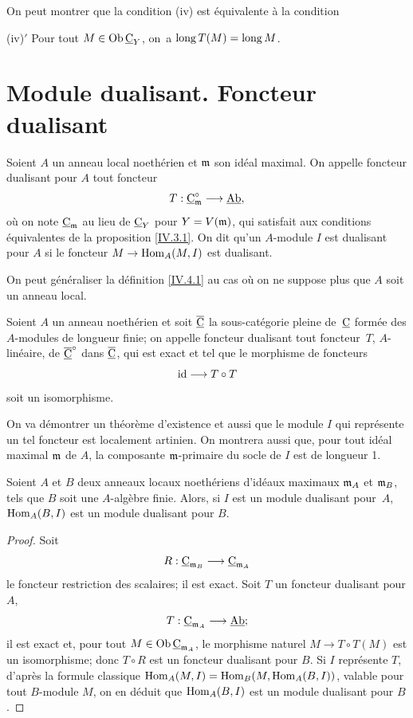 \begin{remarque} \label{IV.3.2}
On peut montrer que la condition (iv) est \'equivalente \`a la condition

(iv)$'$ Pour tout $M\in \operatorname{Ob} \underline{\mathrm{C}}_{Y}$, on~a $\operatorname{long} T(M)=\operatorname{long} M$.
\end{remarque}

\section{Module dualisant. Foncteur dualisant} \label{IV.4}

\begin{definition} \label{IV.4.1}
Soient $A$ un anneau local noeth\'erien et $\mathfrak{m}$ son id\'eal maximal. On appelle foncteur dualisant pour $A$ tout foncteur
$$
T:\ccat^{\circ}_\mm\to \Ab,
$$
o\`u on note $\underline{\mathrm{C}}_{\mathfrak{m}}$ au lieu de $\underline{\mathrm{C}}_{Y}$ pour $Y=V(\mathfrak{m})$, qui satisfait aux conditions \'equivalentes de la proposition \ref{IV.3.1}. On dit qu'un $A$-module $I$ est dualisant pour $A$ si le foncteur $M\to \Hom_{A}(M, I)$ est dualisant.
\end{definition}

On peut g\'en\'eraliser la d\'efinition \ref{IV.4.1} au cas o\`u on ne suppose plus que $A$ soit un anneau local.

\begin{definition} \label{IV.4.2}
Soient $A$ un anneau noeth\'erien et soit $\overline{\underline{\mathrm{C}}}$ la sous-cat\'egorie pleine de~$\underline{\mathrm{C}}$ form\'ee des $A$-modules de longueur finie; on appelle foncteur dualisant tout foncteur~$T$, $A$-lin\'eaire, de $\overline{\underline{\mathrm{C}}}^{\circ}$ dans $\overline{\underline{\mathrm{C}}}$, qui est exact et tel que le morphisme de foncteurs
$$
\id \to T\circ T
$$
soit un isomorphisme.
\end{definition}

On va d\'emontrer un th\'eor\`eme d'existence et aussi que le module $I$ qui repr\'esente un tel foncteur est localement artinien. On montrera aussi que, pour tout id\'eal maximal $\mathfrak{m}$ de $A$, la composante $\mathfrak{m}$-primaire du socle de $I$ est de longueur 1.

\begin{proposition} \label{IV.4.3}
Soient $A$ et $B$ deux anneaux locaux noeth\'eriens d'id\'eaux maximaux $\mathfrak{m}_{A}$ et $\mathfrak{m}_{B}$, tels que $B$ soit une $A$-alg\`ebre finie. Alors, si $I$ est un module dualisant pour~$A$, $\operatorname{Hom}_{A}(B, I)$ est un module dualisant pour $B$.
\end{proposition}

\begin{proof}
Soit
$$
R: \ccat_{\mm_{B}}\to \ccat_{\mm_{A}}
$$
le foncteur restriction des scalaires; il est exact. Soit $T$ un foncteur dualisant pour $A$,
$$
T: \ccat_{\mm_{A}}\to \Ab;
$$
il est exact et, pour tout $M\in \operatorname{Ob} \underline{\mathrm{C}}_{\mathfrak{m}_{A}}$, le morphisme naturel $M\to T\circ T(M)$ est un isomorphisme; donc $T\circ R$ est un foncteur dualisant pour $B$. Si $I$ repr\'esente $T$, d'apr\`es la formule classique $\operatorname{Hom}_{A}(M, I)=\operatorname{Hom}_{B}(M, \operatorname{Hom}_{A}(B, I))$, valable pour tout $B$-module $M$, on en d\'eduit que $\operatorname{Hom}_{A}(B, I)$ est un module dualisant pour $B$.
\skipqed
\end{proof}

